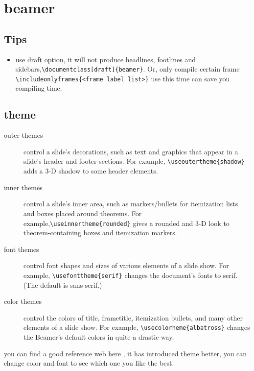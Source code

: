 \documentclass[a4paper,12pt,twoside]{book}
\begin{document}
\section{beamer}
	\subsection{Tips}
	\begin{itemize}
		\item use draft option, it will not produce headlines, footlines and sidebars,\linebreak[4] \verb=\documentclass[draft]{beamer}=. Or, only compile certain frame \linebreak[4] \verb=\includeonlyframes{<frame label list>}=
use this time can save you compiling time.
	\end{itemize}

	\subsection{theme}
	\begin{description}
		\item[outer themes] control a slide's decorations, such as text and graphics that appear in a slide's header and footer sections. For example, \linebreak[4] \verb=\useoutertheme{shadow}= adds a 3-D shadow to some header elements.
		\item[inner themes] control a slide's inner area, such as markers/bullets for itemization lists and boxes placed around theorems. For example,\linebreak[4] \verb=\useinnertheme{rounded}= gives a rounded and 3-D look to theorem-containing boxes and itemization markers.
		\item[font themes] control font shapes and sizes of various elements of a slide show. For example, \verb=\usefonttheme{serif}= changes the document's fonts to serif. (The default is sans-serif.)
		\item[color themes] control the colors of title, frametitle, itemization bullets, and many other elements of a slide show. For example, \linebreak[4] \verb=\usecolorheme{albatross}= changes the Beamer's default colors in quite a drastic way.
	\end{description}
	you can find a good reference web here \cite{QuickStart}, it has introduced theme better, you can change color and font to see which one you like the best.
\end{document}
